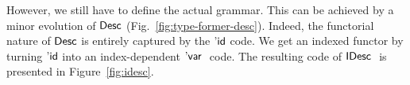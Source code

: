 However, we still have to define the actual grammar. This can be
achieved by a minor evolution of $\Desc$
(Fig.~\ref{fig:type-former-desc}). Indeed, the functorial nature of
$\Desc$ is entirely captured by the $\DId$ code. We get an indexed
functor by turning $\DId$ into an index-dependent $\DVar$ code. The
resulting code of $\IDesc$ is presented in Figure~\ref{fig:idesc}.


